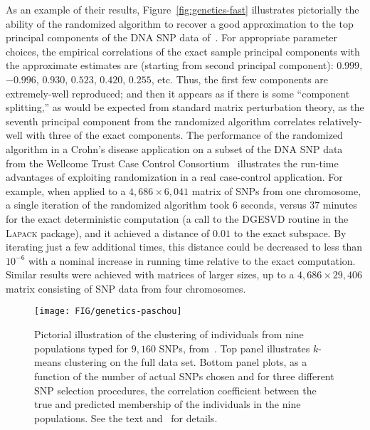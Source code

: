 \documentclass[twoside]{article}
\begin{document}
As an example of their results,
Figure~\ref{fig:genetics-fast} illustrates pictorially the ability of the 
randomized algorithm to recover a good approximation to the top principal 
components of the DNA SNP data of~\cite{Nov08}.
For appropriate parameter choices, the empirical correlations of the exact 
sample principal components with the approximate estimates are (starting 
from second principal component): $0.999$, $-0.996$, $0.930$, $0.523$, 
$0.420$, $0.255$, etc.
Thus, the first few components are extremely-well reproduced; and then it 
appears as if there is some ``component splitting,'' as would be expected 
from standard matrix perturbation theory, as the seventh principal component 
from the randomized algorithm correlates relatively-well with three of the 
exact components.
The performance of the randomized algorithm in a Crohn's disease application 
on a subset of the DNA SNP data from the Wellcome Trust Case Control 
Consortium~\cite{WTC07} illustrates the run-time advantages of exploiting 
randomization in a real case-control application.
For example, when applied to a $4,686 \times 6,041$ matrix of SNPs from one 
chromosome, a single iteration of the randomized algorithm took $6$ seconds, 
versus $37$ minutes for the exact deterministic computation (a call to the 
DGESVD routine in the \textsc{Lapack} package), and it achieved a distance 
of $0.01$ to the exact subspace. 
By iterating just a few additional times, this distance could be decreased 
to less than $10^{-6}$ with a nominal increase in running time relative to 
the exact computation.
Similar results were achieved with matrices of larger sizes, up to a 
$4,686 \times 29,406$ matrix consisting of SNP data from four chromosomes.

\begin{figure}
   \begin{center}
         \texttt{[image: FIG/genetics-paschou]}
\end{center}
\caption{
Pictorial illustration of the clustering of individuals from nine 
populations typed for $9,160$ SNPs, from~\cite{Paschou07b}.
Top panel illustrates $k$-means clustering on the full data set.
Bottom panel plots, as a function of the number of actual SNPs chosen and 
for  three different SNP selection procedures, the correlation coefficient 
between the true and predicted membership of the individuals in the nine 
populations.  See the text and~\cite{Paschou07b} for details.
}
\label{fig:genetics-interp}
\end{figure}
\end{document}
